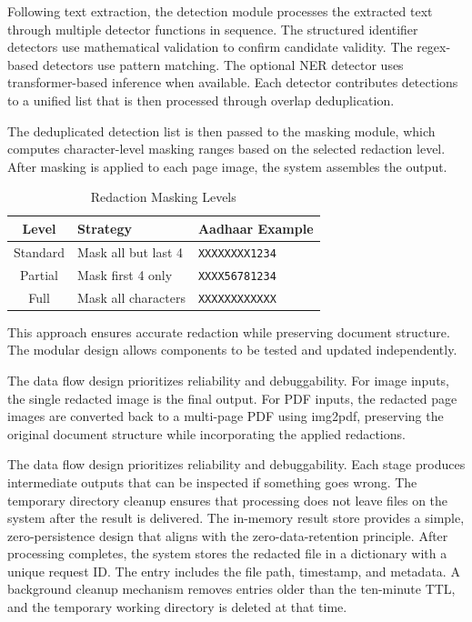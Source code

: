 Following text extraction, the detection module processes the extracted text through multiple detector functions in sequence. The structured identifier detectors use mathematical validation to confirm candidate validity. The regex-based detectors use pattern matching. The optional NER detector uses transformer-based inference when available. Each detector contributes detections to a unified list that is then processed through overlap deduplication.

\bigskip

The deduplicated detection list is then passed to the masking module, which computes character-level masking ranges based on the selected redaction level. After masking is applied to each page image, the system assembles the output.

\begin{table}[htbp]
\caption{Redaction Masking Levels}
\label{tab:masking_levels}
\centering
\begin{tabular}{|c|l|p{4cm}|}
\hline
\textbf{Level} & \textbf{Strategy} & \textbf{Aadhaar Example} \\
\hline
Standard & Mask all but last 4 & \texttt{XXXXXXXX1234} \\
\hline
Partial  & Mask first 4 only   & \texttt{XXXX56781234} \\
\hline
Full     & Mask all characters & \texttt{XXXXXXXXXXXX} \\
\hline
\end{tabular}
\end{table}

\bigskip

This approach ensures accurate redaction while preserving document structure. The modular design allows components to be tested and updated independently.

\bigskip

The data flow design prioritizes reliability and debuggability. For image inputs, the single redacted image is the final output. For PDF inputs, the redacted page images are converted back to a multi-page PDF using img2pdf, preserving the original document structure while incorporating the applied redactions.

\bigskip

The data flow design prioritizes reliability and debuggability. Each stage produces intermediate outputs that can be inspected if something goes wrong. The temporary directory cleanup ensures that processing does not leave files on the system after the result is delivered. The in-memory result store provides a simple, zero-persistence design that aligns with the zero-data-retention principle. After processing completes, the system stores the redacted file in a dictionary with a unique request ID. The entry includes the file path, timestamp, and metadata. A background cleanup mechanism removes entries older than the ten-minute TTL, and the temporary working directory is deleted at that time.

